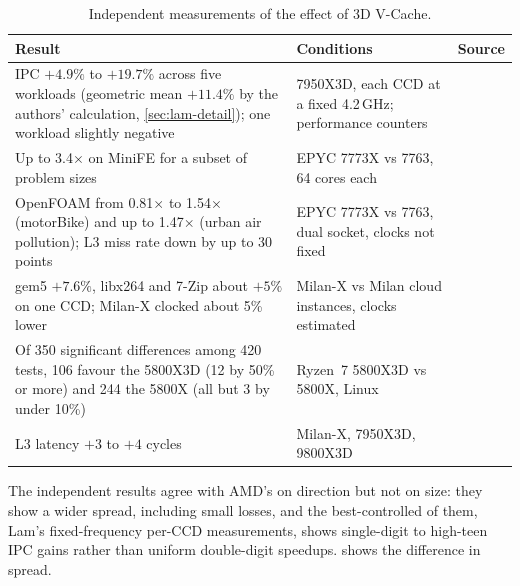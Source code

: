 \begin{table}[htbp]
  \centering
  \caption[Independent measurements of the effect of 3D V-Cache]{Independent measurements of the effect of 3D V-Cache.}
  \label{tab:independent}
  \small
  \begin{tabularx}{\textwidth}{@{}>{\raggedright\arraybackslash}X>{\raggedright\arraybackslash}p{4.6cm}>{\raggedright\arraybackslash}p{1.5cm}@{}}
    \toprule
    \textbf{Result} & \textbf{Conditions} & \textbf{Source} \\
    \midrule
    IPC $+4.9\%$ to $+19.7\%$ across five workloads (geometric mean $+11.4\%$ by the authors' calculation, \cref{sec:lam-detail}); one workload slightly negative & 7950X3D, each CCD at a fixed 4.2\,GHz; performance counters & \cite{lamAMDs7950X3DZen2023} \\
    Up to 3.4$\times$ on MiniFE for a subset of problem sizes & EPYC 7773X vs 7763, 64 cores each & \cite{domkeLocusPerformanceQuantifying2023} \\
    OpenFOAM from 0.81$\times$ to 1.54$\times$ (motorBike) and up to 1.47$\times$ (urban air pollution); L3 miss rate down by up to 30 points & EPYC 7773X vs 7763, dual socket, clocks not fixed & \cite{lawendaEvaluatingImpactL32025} \\
    gem5 $+7.6\%$, libx264 and 7-Zip about $+5\%$ on one CCD; Milan-X clocked about 5\% lower & Milan-X vs Milan cloud instances, clocks estimated & \cite{cozmaDeepDivingZen2022} \\
    Of 350 significant differences among 420 tests, 106 favour the 5800X3D (12 by 50\% or more) and 244 the 5800X (all but 3 by under 10\%) & Ryzen~7 5800X3D vs 5800X, Linux & \cite{larabelAMDRyzen72022} \\
    L3 latency $+3$ to $+4$ cycles & Milan-X, 7950X3D, 9800X3D & \cite{cozmaDeepDivingZen2022,lamAMDs7950X3DZen2023,cozmaAMDs9800X3D2nd2024} \\
    \bottomrule
  \end{tabularx}
\end{table}

The independent results agree with AMD's on direction but not on size: they show a wider spread, including small losses, and the best-controlled of them, Lam's fixed-frequency per-CCD measurements, shows single-digit to high-teen IPC gains rather than uniform double-digit speedups.  shows the difference in spread.

